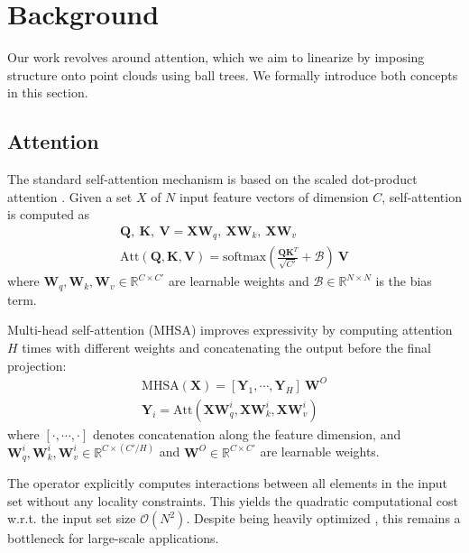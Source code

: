 \section{Background}
Our work revolves around attention, which we aim to linearize by imposing structure onto point clouds using ball trees. We formally introduce both concepts in this section.

\subsection{Attention}
\label{section:attention}
The standard self-attention mechanism is based on the scaled dot-product attention \cite{Vaswani2017AttentionIA}. Given a set $X$ of $N$ input feature vectors of dimension $C$, self-attention is computed as
\begin{equation}
\begin{gathered} 
    \mathbf{Q}, \: \mathbf{K}, \: \mathbf{V} = \mathbf{X W}_q, \: \mathbf{X W}_k, \: \mathbf{X W}_v \\
    \mathrm{Att}(\mathbf{Q},\mathbf{K},\mathbf{V}) = \text{softmax}\left(\frac{\mathbf{QK}^T}{\sqrt{C'}} + \mathcal{B}\right) \: \mathbf{V}
\end{gathered}
\end{equation}
where $\mathbf{W}_q, \mathbf{W}_k, \mathbf{W}_v \in \mathbb{R}^{C \times C'}$ are learnable weights and $\mathcal{B} \in \mathbb{R}^{N \times N}$ is the bias term.

Multi-head self-attention (MHSA) improves expressivity by computing attention $H$ times with different weights and concatenating the output before the final projection:
\begin{equation}
\begin{gathered} 
\mathrm{MHSA}(\mathbf{X}) = [\mathbf{Y}_1, \cdots, \mathbf{Y}_H] \: \mathbf{W}^O \\
\mathbf{Y}_i = \mathrm{Att}(\mathbf{X} \mathbf{W}_q^i, \mathbf{X} \mathbf{W}_k^i, \mathbf{X} \mathbf{W}_v^i)
\end{gathered}
\end{equation}
where $[\cdot,\cdots,\cdot]$ denotes concatenation along the feature dimension, and $\mathbf{W}^i_q, \mathbf{W}^i_k, \mathbf{W}^i_v \in \mathbb{R}^{C \times (C' / H)}$ and $\mathbf{W}^O \in \mathbb{R}^{C \times C'}$ are learnable weights.

The operator explicitly computes interactions between all elements in the input set without any locality constraints. This yields the quadratic computational cost w.r.t. the input set size $\mathcal{O}(N^2)$. Despite being heavily optimized \cite{Dao2023FlashAttention2FA}, this remains a bottleneck for large-scale applications. 

